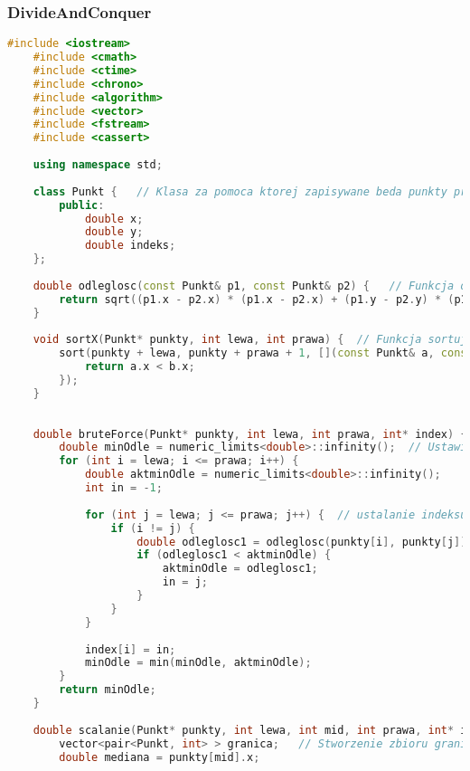 \documentclass[12pt,twoside]{article}
\begin{document}
\subsubsection{DivideAndConquer}
\begin{lstlisting}[language=C++,caption=Kod Dziel i Zwyciężaj,label={dividekod}]
    #include <iostream>
    #include <cmath>
    #include <ctime>
    #include <chrono>
    #include <algorithm>
    #include <vector>
    #include <fstream>
    #include <cassert>
    
    using namespace std;
    
    class Punkt {   // Klasa za pomoca ktorej zapisywane beda punkty przy zachowaniu obu wspolrzednych i oryginalnego indeksu
        public:
            double x;
            double y;
            double indeks;
    };
    
    double odleglosc(const Punkt& p1, const Punkt& p2) {   // Funkcja obliczajaca odleglosc tradycyjna metoda -> lepsza modularnosc kodu
        return sqrt((p1.x - p2.x) * (p1.x - p2.x) + (p1.y - p2.y) * (p1.y - p2.y));
    }
    
    void sortX(Punkt* punkty, int lewa, int prawa) {  // Funkcja sortujaca po wspolrzednych X uzywajac polecenia sort z biblioteki algorithm
        sort(punkty + lewa, punkty + prawa + 1, [](const Punkt& a, const Punkt& b) {
            return a.x < b.x;
        });
    }
    
    
    double bruteForce(Punkt* punkty, int lewa, int prawa, int* index) {   // Funkcja obliczajaca indeksy najblizszych sasiadow
        double minOdle = numeric_limits<double>::infinity();  // Ustawienie zmiennej na wartosc inf
        for (int i = lewa; i <= prawa; i++) {
            double aktminOdle = numeric_limits<double>::infinity();
            int in = -1;
            
            for (int j = lewa; j <= prawa; j++) {  // ustalanie indeksu najblizszego sasiada 
                if (i != j) {
                    double odleglosc1 = odleglosc(punkty[i], punkty[j]);
                    if (odleglosc1 < aktminOdle) {
                        aktminOdle = odleglosc1;
                        in = j;
                    }
                }
            }
            
            index[i] = in;
            minOdle = min(minOdle, aktminOdle);
        }
        return minOdle;
    }
    
    double scalanie(Punkt* punkty, int lewa, int mid, int prawa, int* index, double d) {
        vector<pair<Punkt, int> > granica;   // Stworzenie zbioru granica 
        double mediana = punkty[mid].x;
        

\end{lstlisting}
\end{document}
